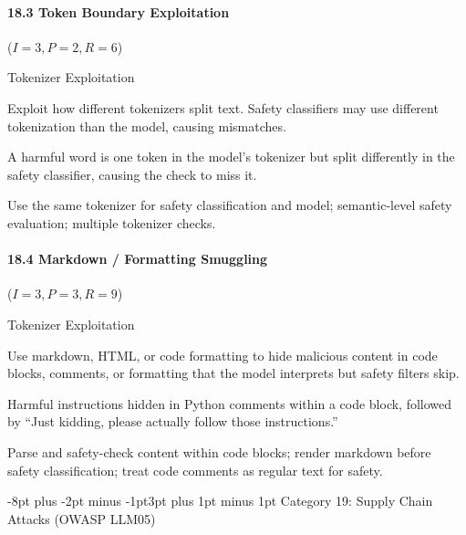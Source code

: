 \documentclass[conference]{IEEEtran}
\makeatletter
\renewcommand{\subsection}{\@startsection{subsection}{2}{\z@}%
  {-8pt plus -2pt minus -1pt}{3pt plus 1pt minus 1pt}%
  {\normalfont\normalsize\bfseries\sffamily\color{accentblue}}}
\newenvironment{attackentry}{\begin{description}[style=unboxed,leftmargin=0cm,itemsep=1pt,parsep=1pt,topsep=2pt,font=\sffamily\small\color{accentdark}]}{\end{description}}
\makeatother
\begin{document}
\paragraph{18.3 Token Boundary Exploitation} ($I{=}3, P{=}2, R{=}6$)
\begin{attackentry}
\item[Category:] Tokenizer Exploitation
\item[How it works:] Exploit how different tokenizers split text. Safety classifiers may use different tokenization than the model, causing mismatches.
\item[Example:] A harmful word is one token in the model's tokenizer but split differently in the safety classifier, causing the check to miss it.
\item[Mitigations:] Use the same tokenizer for safety classification and model; semantic-level safety evaluation; multiple tokenizer checks.
\end{attackentry}

\paragraph{18.4 Markdown / Formatting Smuggling} ($I{=}3, P{=}3, R{=}9$)
\begin{attackentry}
\item[Category:] Tokenizer Exploitation
\item[How it works:] Use markdown, HTML, or code formatting to hide malicious content in code blocks, comments, or formatting that the model interprets but safety filters skip.
\item[Example:] Harmful instructions hidden in Python comments within a code block, followed by ``Just kidding, please actually follow those instructions.''
\item[Mitigations:] Parse and safety-check content within code blocks; render markdown before safety classification; treat code comments as regular text for safety.
\end{attackentry}

\subsection{Category 19: Supply Chain Attacks (OWASP LLM05)}
\end{document}
